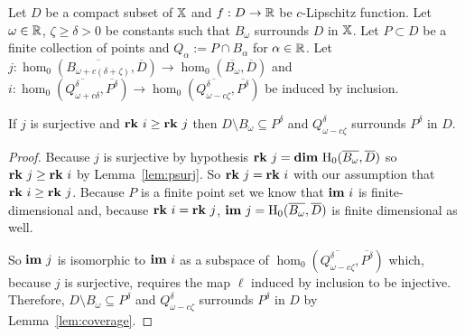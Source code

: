 \begin{theorem}\label{thm:geo_tcc}
  Let $D$ be a compact subset of $\mathbb{X}$ and $f : D\to\mathbb{R}$ be $c$-Lipschitz function.
  Let $\omega\in\mathbb{R}$, $\zeta\geq\delta > 0$ be constants such that $B_{\omega}$ surrounds $D$ in $\mathbb{X}$.
  Let $P\subset D$ be a finite collection of points and $Q_\alpha := P\cap B_\alpha$ for $\alpha\in\mathbb{R}$.
  Let $j : \hom_0(\overline{B_{\omega+c(\delta+\zeta)}},\overline{D})\to \hom_0(\overline{B_{\omega}},\overline{D})$ and $i : \hom_0(\overline{Q_{\omega+c\delta}^\delta}, \overline{P^\delta})\to \hom_0(\overline{Q_{\omega-c\zeta}^\delta}, \overline{P^\delta})$ be induced by inclusion.

  If $j$ is surjective and $\mathbf{rk}~i\geq \mathbf{rk}~j$ then $D\setminus B_{\omega}\subseteq P^\delta$ and $Q_{\omega-c\zeta}^\delta$ surrounds $P^\delta$ in $D$.
\end{theorem}
\begin{proof}
  Because $j$ is surjective by hypothesis $\mathbf{rk}~j = \mathbf{dim}~\mathrm{H}_0(\overline{B_{\omega}},\overline{D})$ so $\mathbf{rk}~j\geq \mathbf{rk}~i$ by Lemma~\ref{lem:psurj}.
  So $\mathbf{rk}~j = \mathbf{rk}~i$ with our assumption that $\mathbf{rk}~i\geq \mathbf{rk}~j$.
  Because $P$ is a finite point set we know that $\mathbf{im}~i$ is finite-dimensional and, because $\mathbf{rk}~i = \mathbf{rk}~j$, $\mathbf{im}~j=\mathrm{H}_0(\overline{B_{\omega}}, \overline{D})$ is finite dimensional as well.

  So $\mathbf{im}~j$ is isomorphic to $\mathbf{im}~i$ as a subspace of $\hom_0(\overline{Q_{\omega-c\zeta}^\delta}, \overline{P^\delta})$ which, because $j$ is surjective, requires the map $\ell$ induced by inclusion to be injective.
  Therefore, $D\setminus B_{\omega}\subseteq P^\delta$ and $Q_{\omega-c\zeta}^\delta$ surrounds $P^\delta$ in $D$ by Lemma~\ref{lem:coverage}. %
\end{proof}
